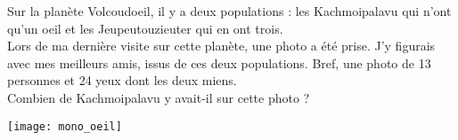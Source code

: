 \begin{enigme}

\begin{minipage}[c]{0.48\linewidth}
Sur la planète Volcoudoeil, il y a deux populations : les Kachmoipalavu qui n'ont qu'un oeil et les Jeupeutouzieuter qui en ont trois. \\[0.5em]
Lors de ma dernière visite sur cette planète, une photo a été prise. J'y figurais avec mes meilleurs amis, issus de ces deux populations. Bref, une photo de 13 personnes et 24 yeux dont les deux miens. \\[0.5em]
Combien de Kachmoipalavu y avait-il sur cette photo ?
 \end{minipage} \hfill%
 \begin{minipage}[c]{0.48\linewidth}
  \texttt{[image: mono\_oeil]}
  \end{minipage} \\

\end{enigme} 
